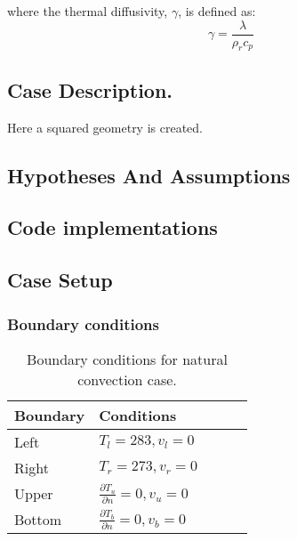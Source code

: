 where the thermal diffusivity, $\gamma$, is defined as:
\begin{equation}
	\gamma=\frac{\lambda}{\rho_{r} c_{p}}
\end{equation}

\subsection{Case Description.}
Here a squared geometry is created.


\subsection{Hypotheses And Assumptions}

\subsection{Code implementations}
\subsection{Case Setup}
\subsubsection*{Boundary conditions}
\begin{table}[h!]
	\begin{tabular}{@{}lllll@{}}
		\toprule[1pt]
		\textbf{Boundary} & \textbf{Conditions}  \\ \midrule[2pt]
		Left & $T_{l}=283, v_{l} = 0   $  \\
		Right & $T_{r}=273, v_{r} = 0 $ \\
		Upper & $\frac{\partial T_{u}}{\partial n} = 0, v_{u} = 0$  \\
		Bottom & $\frac{\partial T_{b}}{\partial n} = 0, v_{b} = 0$  \\ \bottomrule[1pt]		
	\end{tabular}
	\centering
	\caption{Boundary conditions for natural convection case.}	
	\label{fig:boundaryCdsNaturalConvection}
\end{table}

